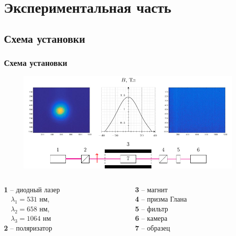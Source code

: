 \documentclass[10pt,pdf,hyperref={unicode}, dvipsnames]{beamer}
\begin{document}
\section{Экспериментальная часть}
\begin{frame}
	\subsection{Схема установки}
	\frametitle{Схема установки}
	\begin{figure}[tb]
		\centering
		\includegraphics[width=1\textwidth]{images/chem}
	\end{figure}
	\begin{columns}
		\hspace{2.5cm}
		\begin{column}{0.3\textwidth}
			\textbf{1} -- диодный лазер\\ 
			$\quad\lambda_1=531$ нм,\\
			$\quad\lambda_2=658$ нм,\\
			$\quad\lambda_3=1064$ нм\\
			\textbf{2} -- поляризатор
		\end{column}
		\hspace{1.6cm}
		\begin{column}{0.7\textwidth}
			\textbf{3} -- магнит\\
			\textbf{4} -- призма Глана\\
			\textbf{5} -- фильтр\\
			\textbf{6} -- камера\\
			\textbf{7} -- образец
		\end{column}
	\end{columns}
\end{frame}

\end{document}
